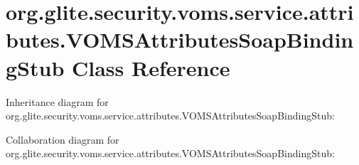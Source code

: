 \hypertarget{classorg_1_1glite_1_1security_1_1voms_1_1service_1_1attributes_1_1VOMSAttributesSoapBindingStub}{
\section{org.glite.security.voms.service.attributes.VOMSAttributesSoapBindingStub Class Reference}
\label{classorg_1_1glite_1_1security_1_1voms_1_1service_1_1attributes_1_1VOMSAttributesSoapBindingStub}
}


Inheritance diagram for org.glite.security.voms.service.attributes.VOMSAttributesSoapBindingStub:


Collaboration diagram for org.glite.security.voms.service.attributes.VOMSAttributesSoapBindingStub:
